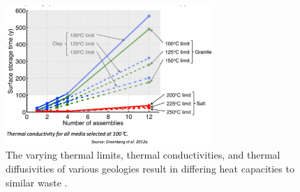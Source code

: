 \begin{figure}[htbp!]
  \begin{center}
    \includegraphics[width=0.7\textwidth]{./images/greenberg_thermal.eps}
  \end{center}
  \caption{The varying thermal limits, thermal conductivities, and thermal 
    diffusivities of various geologies result in differing heat capacities to 
    similar waste \cite{greenberg_application_2012}.}
  \label{fig:greenberg_thermal}
\end{figure}
